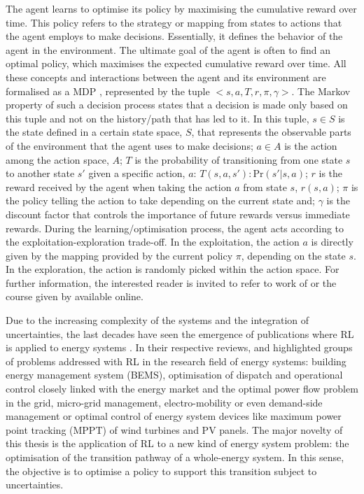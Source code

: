 The agent learns to optimise its policy by maximising the cumulative reward over time. This policy refers to the strategy or mapping from states to actions that the agent employs to make decisions. Essentially, it defines the behavior of the agent in the environment. The ultimate goal of the agent is often to find an optimal policy, which maximises the expected cumulative reward over time.  All these concepts and interactions between the agent and its environment are formalised as a \gls{MDP} \cite{sutton2018reinforcement}, represented by the tuple $<s,a,T,r,\pi,\gamma>$.  The Markov property of such a decision process states that a decision is made only based on this tuple and not on the history/path that has led to it. In this tuple, $s\in S$ is the state defined in a certain state space, $S$, that represents the observable parts of the environment that the agent uses to make decisions; $a\in A$ is the action among the action space, $A$; $T$ is the probability of transitioning from one state $s$ to another state $s'$ given a specific action, $a$: $T(s,a,s'): \text{Pr}\left(s'|s,a\right)$; $r$ is the reward received by the agent when taking the action $a$ from state $s$, $r(s,a)$; $\pi$ is the policy telling the action to take depending on the current state and; $\gamma$ is the discount factor that controls the importance of future rewards versus immediate rewards. During the learning/optimisation process, the agent acts according to the exploitation-exploration trade-off. In the exploitation, the action $a$ is directly given by the mapping provided by the current policy $\pi$,  depending on the state $s$. In the exploration, the action is randomly picked within the action space. For further information, the interested reader is invited to refer to work of \citet{sutton2018reinforcement} or the course given by \citet{davidsilver_RL_online} available online.

Due to the increasing complexity of the systems and the integration of uncertainties, the last decades have seen the emergence of publications where \gls{RL} is applied to energy systems \cite{cao2020reinforcement,perera2021applications}. In their respective reviews, \citet{cao2020reinforcement} and \citet{perera2021applications} highlighted groups of problems addressed with \gls{RL} in the research field of energy systems: building energy management system (BEMS), optimisation of dispatch and operational control closely linked with the energy market and the optimal power flow problem in the grid, micro-grid management, electro-mobility or even demand-side management or optimal control of energy system devices like maximum power point tracking (MPPT) of wind turbines and \gls{PV} panels.  The major novelty of this thesis is the application of \gls{RL} to a new kind of energy system problem: the optimisation of the transition pathway of a whole-energy system. In this sense, the objective is to optimise a policy to support this transition subject to uncertainties.

